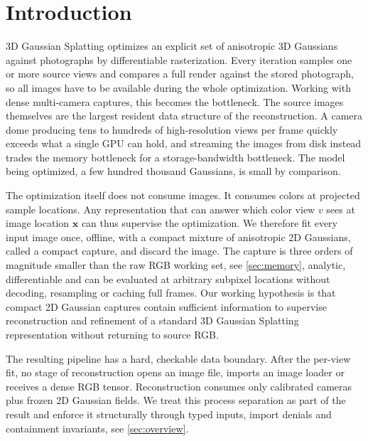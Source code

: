 \section{Introduction}
\label{sec:introduction}

3D Gaussian Splatting \citep{kerbl2023_3dgs} optimizes an explicit set of anisotropic 3D
Gaussians against photographs by differentiable rasterization.  Every iteration samples one
or more source views and compares a full render against the stored photograph, so all
images have to be available during the whole optimization.  Working with dense multi-camera
captures, this becomes the bottleneck.  The source images themselves are the largest
resident data structure of the reconstruction.  A camera dome producing tens to hundreds of
high-resolution views per frame quickly exceeds what a single GPU can hold, and streaming
the images from disk instead trades the memory bottleneck for a storage-bandwidth
bottleneck.  The model being optimized, a few hundred thousand Gaussians, is small by
comparison.

The optimization itself does not consume images.  It consumes colors at projected sample
locations.  Any representation that can answer which color view $v$ sees at image location
$\bm{x}$ can thus supervise the optimization.  We therefore fit every input image once,
offline, with a compact mixture of anisotropic 2D Gaussians, called a compact capture, and
discard the image.  The capture is three orders of magnitude smaller than the raw RGB
working set, see \cref{sec:memory}, analytic, differentiable and can be evaluated at
arbitrary subpixel locations without decoding, resampling or caching full frames.  Our
working hypothesis is that compact 2D Gaussian captures contain sufficient information to
supervise reconstruction and refinement of a standard 3D Gaussian Splatting representation
without returning to source RGB.

The resulting pipeline has a hard, checkable data boundary.  After the per-view fit, no
stage of reconstruction opens an image file, imports an image loader or receives a dense
RGB tensor.  Reconstruction consumes only calibrated cameras plus frozen 2D Gaussian
fields.  We treat this process separation as part of the result and enforce it
structurally through typed inputs, import denials and containment invariants, see
\cref{sec:overview}.

